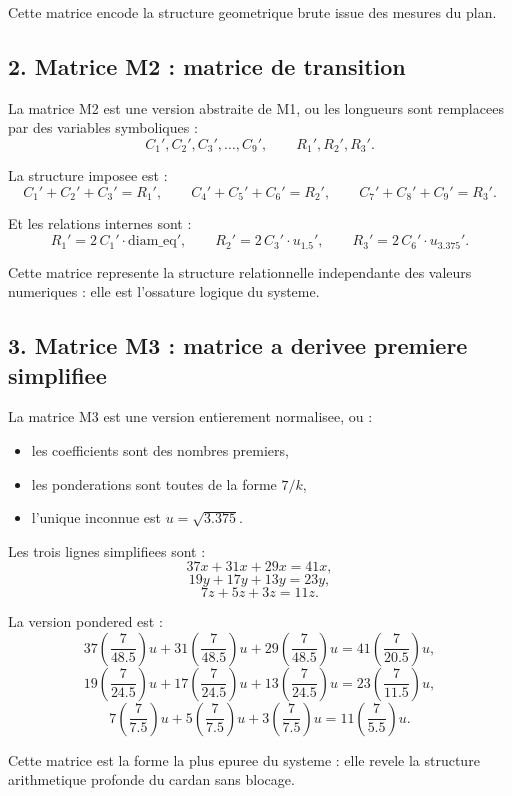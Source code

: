 \documentclass[12pt,a4paper]{article}
\theoremstyle{definition}
\theoremstyle{remark}
\begin{document}
Cette matrice encode la structure geometrique brute issue des mesures du plan.
\subsection{2. Matrice M2 : matrice de transition}

La matrice M2 est une version abstraite de M1, ou les longueurs sont remplacees
par des variables symboliques :
\[
  C_1', C_2', C_3',\dots,C_9',\qquad R_1', R_2', R_3'.
\]

La structure imposee est :
\[
  C_1' + C_2' + C_3' = R_1',\qquad
  C_4' + C_5' + C_6' = R_2',\qquad
  C_7' + C_8' + C_9' = R_3'.
\]

Et les relations internes sont :
\[
  R_1' = 2\, C_1' \cdot \mathrm{diam\_eq}',\qquad
  R_2' = 2\, C_3' \cdot u_{1.5}',\qquad
  R_3' = 2\, C_6' \cdot u_{3.375}'.
\]

Cette matrice represente la structure relationnelle independante des valeurs
numeriques : elle est l'ossature logique du systeme.

\subsection{3. Matrice M3 : matrice a derivee premiere simplifiee}

La matrice M3 est une version entierement normalisee, ou :
\begin{itemize}
  \item les coefficients sont des nombres premiers,
  \item les ponderations sont toutes de la forme \(7 / k\),
  \item l'unique inconnue est \(u = \sqrt{3.375}\).
\end{itemize}

Les trois lignes simplifiees sont :
\[
  37x + 31x + 29x = 41x,
\]
\[
  19y + 17y + 13y = 23y,
\]
\[
   7z +  5z +  3z = 11z.
\]

La version pondered est :
\[
  37\left(\frac{7}{48.5}\right)u
  + 31\left(\frac{7}{48.5}\right)u
  + 29\left(\frac{7}{48.5}\right)u
  = 41\left(\frac{7}{20.5}\right)u,
\]
\[
  19\left(\frac{7}{24.5}\right)u
  + 17\left(\frac{7}{24.5}\right)u
  + 13\left(\frac{7}{24.5}\right)u
  = 23\left(\frac{7}{11.5}\right)u,
\]
\[
   7\left(\frac{7}{7.5}\right)u
  +  5\left(\frac{7}{7.5}\right)u
  +  3\left(\frac{7}{7.5}\right)u
  = 11\left(\frac{7}{5.5}\right)u.
\]

Cette matrice est la forme la plus epuree du systeme : elle revele la structure
arithmetique profonde du cardan sans blocage.
\end{document}
